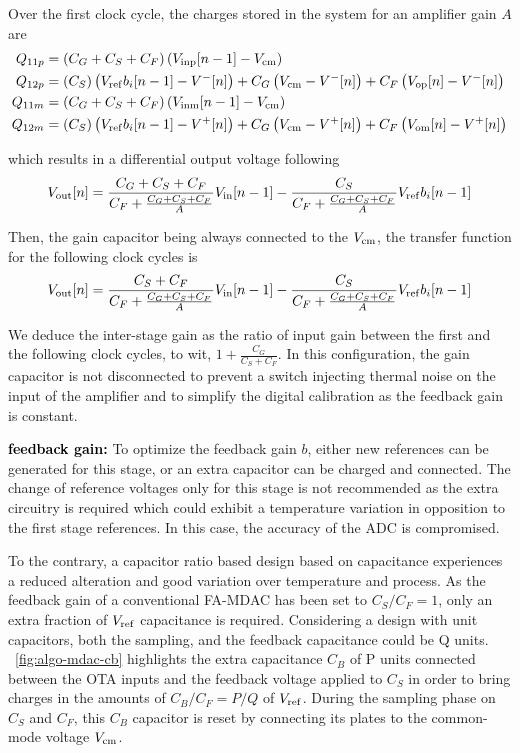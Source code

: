 Over the first clock cycle, the charges stored in the system for an amplifier gain $A$ are
\begin{align}
Q_{11p} &= \left(C_G+C_S+C_F \right) \left( V_{\rm inp}[n-1] - V_{\rm cm} \right)\\
Q_{12p} &= \left(C_S \right) \left( V_{\rm ref}b_i[n-1] - V^{-}[n] \right) + C_G \left(V_{\rm cm}-V^{-}[n] \right)  + C_F \left(V_{\rm op}[n]-V^{-}[n] \right) \\
Q_{11m} &= \left(C_G+C_S+C_F \right) \left( V_{\rm inm}[n-1] - V_{\rm cm} \right) \\
Q_{12m} &= \left(C_S \right) \left( V_{\rm ref}b_i[n-1] - V^{+}[n] \right) + C_G \left(V_{\rm cm}-V^{+}[n] \right)  + C_F \left(V_{\rm om}[n]-V^{+}[n] \right)
\end{align}

which results in a differential output voltage following 
\begin{equation}
	V_{\rm out}[n] = \frac{C_G+C_S+C_F}{C_F+\frac{C_G+C_S+C_F}{A}} V_{\rm in}[n-1] - \frac{C_S}{C_F+\frac{C_G+C_S+C_F}{A}} V_{\rm ref}b_i[n-1]
\end{equation}

Then, the gain capacitor being always connected to the $V_{\rm cm}$, the transfer function for the following clock cycles is 
\begin{equation}
	V_{\rm out}[n] = \frac{C_S+C_F}{C_F+\frac{C_G+C_S+C_F}{A}} V_{\rm in}[n-1] - \frac{C_S}{C_F+\frac{C_G+C_S+C_F}{A}} V_{\rm ref}b_i[n-1]
\end{equation}

We deduce the inter-stage gain as the ratio of input gain between the first and the following clock cycles, to wit, $1+\frac{C_G}{C_S+C_F}$.  In this configuration, the gain capacitor is not disconnected to prevent a switch injecting thermal noise on the input of the amplifier and to simplify the digital calibration as the feedback gain is constant.

\textbf{\textcolor{black}{feedback gain:}}
To optimize the feedback gain $b$, either new references can be generated for this stage, or an extra capacitor can be charged and connected. The change of reference voltages only for this stage is not recommended as the extra circuitry is required which could exhibit a temperature variation in opposition to the first stage references. In this case, the accuracy of the ADC is compromised.

To the contrary, a capacitor ratio based design based on capacitance experiences a reduced alteration and good variation over temperature and process. As the feedback gain of a conventional FA-MDAC has been set to \(C_S/C_F = 1\), only an extra fraction of \(V_{\rm ref}\) capacitance is required. Considering a design with unit capacitors, both the sampling, and the feedback capacitance could be Q units. \figurename~\ref{fig:algo-mdac-cb} highlights the extra capacitance \(C_B\) of P units connected between the OTA inputs and the feedback voltage applied to \(C_S\) in order to bring charges in the amounts of \(C_B/C_F = P/Q\) of \(V_{\rm ref}\). During the sampling phase on \(C_S\) and \(C_F\), this \(C_B\) capacitor is reset by connecting its plates to the common-mode voltage \(V_{\rm cm}\).

